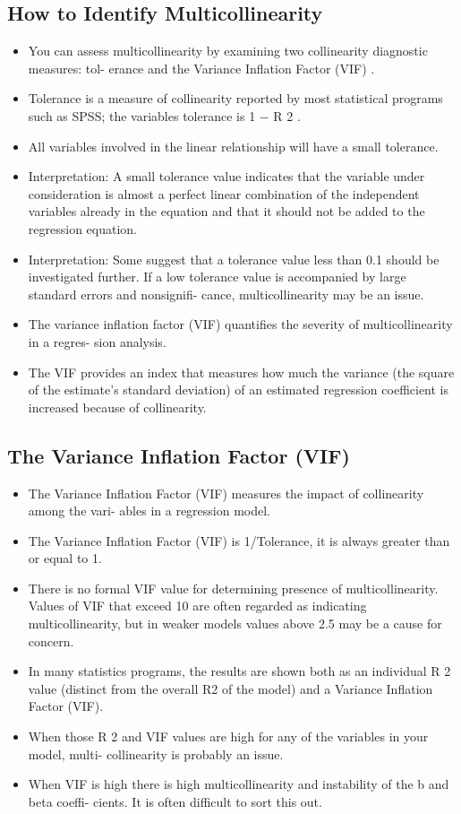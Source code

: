\documentclass[a4paper,12pt]{article}
\begin{document}
\subsection{How to Identify Multicollinearity}
\begin{itemize}
\item You can assess multicollinearity by examining two collinearity diagnostic measures: tol-
erance and the Variance Inflation Factor (VIF) .
\item Tolerance is a measure of collinearity reported by most statistical programs such as SPSS;
the variables tolerance is 1 − R 2 .
\item All variables involved in the linear relationship will have a small tolerance.
\item Interpretation: A small tolerance value indicates that the variable under consideration
is almost a perfect linear combination of the independent variables already in the equation
and that it should not be added to the regression equation.
\item Interpretation: Some suggest that a tolerance value less than 0.1 should be investigated
further. If a low tolerance value is accompanied by large standard errors and nonsignifi-
cance, multicollinearity may be an issue.
\item The variance inflation factor (VIF) quantifies the severity of multicollinearity in a regres-
sion analysis.
\item The VIF provides an index that measures how much the variance (the square of the
estimate’s standard deviation) of an estimated regression coefficient is increased because
of collinearity.
\end{itemize}
\subsection*{ The Variance Inflation Factor (VIF)}
\begin{itemize}
\item The Variance Inflation Factor (VIF) measures the impact of collinearity among the vari-
ables in a regression model.
\item The Variance Inflation Factor (VIF) is 1/Tolerance, it is always greater than or equal to
1.
\item There is no formal VIF value for determining presence of multicollinearity. Values of VIF
that exceed 10 are often regarded as indicating multicollinearity, but in weaker models
values above 2.5 may be a cause for concern.
\item In many statistics programs, the results are shown both as an individual R 2 value (distinct
from the overall R2 of the model) and a Variance Inflation Factor (VIF).
\item When those R 2 and VIF values are high for any of the variables in your model, multi-
collinearity is probably an issue.
\item When VIF is high there is high multicollinearity and instability of the b and beta coeffi-
cients. It is often difficult to sort this out.
\end{itemize}
\end{document}
